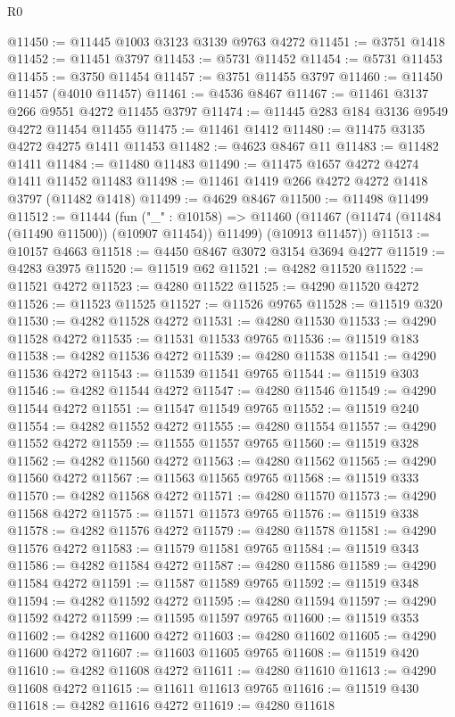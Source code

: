 \begin{lexlean}{R0}
\begin{coremodule}
@11450 := @11445 @1003 @3123 @3139 @9763 @4272
@11451 := @3751 @1418
@11452 := @11451 @3797
@11453 := @5731 @11452
@11454 := @5731 @11453
@11455 := @3750 @11454
@11457 := @3751 @11455 @3797
@11460 := @11450 @11457 (@4010 @11457)
@11461 := @4536 @8467
@11467 := @11461 @3137 @266 @9551 @4272 @11455 @3797
@11474 := @11445 @283 @184 @3136 @9549 @4272 @11454 @11455
@11475 := @11461 @1412
@11480 := @11475 @3135 @4272 @4275 @1411 @11453
@11482 := @4623 @8467 @11
@11483 := @11482 @1411
@11484 := @11480 @11483
@11490 := @11475 @1657 @4272 @4274 @1411 @11452 @11483
@11498 := @11461 @1419 @266 @4272 @4272 @1418 @3797 (@11482 @1418)
@11499 := @4629 @8467
@11500 := @11498 @11499
@11512 := @11444
    (fun ("_" : @10158) =>
    @11460 (@11467 (@11474 (@11484 (@11490 @11500)) (@10907 @11454)) @11499) (@10913 @11457))
@11513 := @10157 @4663
@11518 := @4450 @8467 @3072 @3154 @3694 @4277
@11519 := @4283 @3975
@11520 := @11519 @62
@11521 := @4282 @11520
@11522 := @11521 @4272
@11523 := @4280 @11522
@11525 := @4290 @11520 @4272
@11526 := @11523 @11525
@11527 := @11526 @9765
@11528 := @11519 @320
@11530 := @4282 @11528 @4272
@11531 := @4280 @11530
@11533 := @4290 @11528 @4272
@11535 := @11531 @11533 @9765
@11536 := @11519 @183
@11538 := @4282 @11536 @4272
@11539 := @4280 @11538
@11541 := @4290 @11536 @4272
@11543 := @11539 @11541 @9765
@11544 := @11519 @303
@11546 := @4282 @11544 @4272
@11547 := @4280 @11546
@11549 := @4290 @11544 @4272
@11551 := @11547 @11549 @9765
@11552 := @11519 @240
@11554 := @4282 @11552 @4272
@11555 := @4280 @11554
@11557 := @4290 @11552 @4272
@11559 := @11555 @11557 @9765
@11560 := @11519 @328
@11562 := @4282 @11560 @4272
@11563 := @4280 @11562
@11565 := @4290 @11560 @4272
@11567 := @11563 @11565 @9765
@11568 := @11519 @333
@11570 := @4282 @11568 @4272
@11571 := @4280 @11570
@11573 := @4290 @11568 @4272
@11575 := @11571 @11573 @9765
@11576 := @11519 @338
@11578 := @4282 @11576 @4272
@11579 := @4280 @11578
@11581 := @4290 @11576 @4272
@11583 := @11579 @11581 @9765
@11584 := @11519 @343
@11586 := @4282 @11584 @4272
@11587 := @4280 @11586
@11589 := @4290 @11584 @4272
@11591 := @11587 @11589 @9765
@11592 := @11519 @348
@11594 := @4282 @11592 @4272
@11595 := @4280 @11594
@11597 := @4290 @11592 @4272
@11599 := @11595 @11597 @9765
@11600 := @11519 @353
@11602 := @4282 @11600 @4272
@11603 := @4280 @11602
@11605 := @4290 @11600 @4272
@11607 := @11603 @11605 @9765
@11608 := @11519 @420
@11610 := @4282 @11608 @4272
@11611 := @4280 @11610
@11613 := @4290 @11608 @4272
@11615 := @11611 @11613 @9765
@11616 := @11519 @430
@11618 := @4282 @11616 @4272
@11619 := @4280 @11618

\end{coremodule}
\end{lexlean}
